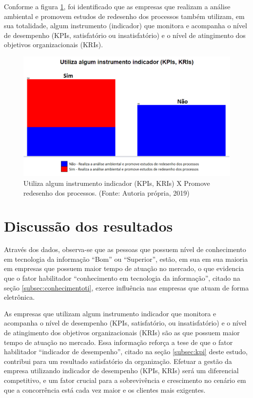 Conforme a figura \ref{fig:grafico414}, foi identificado que as empresas que realizam a análise ambiental e promovem estudos de redesenho dos processos também utilizam, em sua totalidade, algum instrumento (indicador)  que monitora e acompanha o nível de desempenho (KPIs, satisfatório ou insatisfatório) e o nível de atingimento dos objetivos organizacionais (KRIs).

\begin{figure}[H]

\centering
\includegraphics[width=13cm]{./fig/grafico12}
\caption{Utiliza algum instrumento indicador (KPIs, KRIs) X Promove redesenho dos processos. (Fonte: Autoria própria, 2019)}
\label{fig:grafico414}
\end{figure}


\section{Discussão dos resultados}
\label{subsec:framing}

Através dos dados, observa-se que as pessoas que possuem nível de conhecimento em tecnologia da informação “Bom” ou “Superior”, estão, em sua em sua maioria em empresas que possuem maior tempo de atuação no mercado, o que evidencia que o fator habilitador “conhecimento em tecnologia da informação”, citado na seção \ref{subsec:conhecimentoti}, exerce influência nas empresas que atuam de forma eletrônica.

As empresas que utilizam algum instrumento indicador que monitora e acompanha o nível de desempenho (KPIs, satisfatório, ou insatisfatório) e o nível de atingimento dos objetivos organizacionais (KRIs) são as que possuem maior tempo de atuação no mercado. Essa informação reforça a tese de que o fator habilitador “indicador de desempenho”, citado na seção \ref{subsec:kpi} deste estudo, contribui para um resultado satisfatório da organização. Efetuar a gestão da empresa utilizando indicador de desempenho (KPIs, KRIs) será um diferencial competitivo, e um fator crucial para a sobrevivência e crescimento no cenário em que a concorrência está cada vez maior e os clientes mais exigentes.


